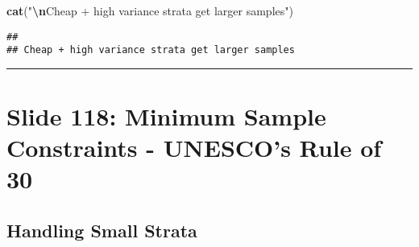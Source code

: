 \documentclass[
]{article}
\newenvironment{Shaded}{\begin{snugshade}}{\end{snugshade}}
\newcommand{\FunctionTok}[1]{\textcolor[rgb]{0.13,0.29,0.53}{\textbf{#1}}}
\newcommand{\NormalTok}[1]{#1}
\newcommand{\SpecialCharTok}[1]{\textcolor[rgb]{0.81,0.36,0.00}{\textbf{#1}}}
\newcommand{\StringTok}[1]{\textcolor[rgb]{0.31,0.60,0.02}{#1}}
\begin{document}
\begin{Shaded}
\begin{Highlighting}[]
\FunctionTok{cat}\NormalTok{(}\StringTok{"}\SpecialCharTok{\textbackslash{}n}\StringTok{Cheap + high variance strata get larger samples"}\NormalTok{)}
\end{Highlighting}
\end{Shaded}

\begin{verbatim}
## 
## Cheap + high variance strata get larger samples
\end{verbatim}

\begin{center}\rule{0.5\linewidth}{0.5pt}\end{center}

\section{Slide 118: Minimum Sample Constraints - UNESCO's Rule of
30}\label{slide-118-minimum-sample-constraints---unescos-rule-of-30}

\subsection{Handling Small Strata}\label{handling-small-strata}
\end{document}
